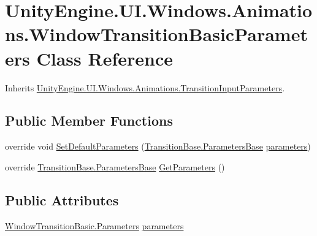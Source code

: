 \hypertarget{class_unity_engine_1_1_u_i_1_1_windows_1_1_animations_1_1_window_transition_basic_parameters}{}\section{Unity\+Engine.\+U\+I.\+Windows.\+Animations.\+Window\+Transition\+Basic\+Parameters Class Reference}
\label{class_unity_engine_1_1_u_i_1_1_windows_1_1_animations_1_1_window_transition_basic_parameters}


Inherits \hyperlink{class_unity_engine_1_1_u_i_1_1_windows_1_1_animations_1_1_transition_input_parameters}{Unity\+Engine.\+U\+I.\+Windows.\+Animations.\+Transition\+Input\+Parameters}.

\subsection*{Public Member Functions}
\begin{DoxyCompactItemize}
\item 
override void \hyperlink{class_unity_engine_1_1_u_i_1_1_windows_1_1_animations_1_1_window_transition_basic_parameters_a62552986f2ad19d5538ff935cb600c79}{Set\+Default\+Parameters} (\hyperlink{class_unity_engine_1_1_u_i_1_1_windows_1_1_animations_1_1_transition_base_1_1_parameters_base}{Transition\+Base.\+Parameters\+Base} \hyperlink{class_unity_engine_1_1_u_i_1_1_windows_1_1_animations_1_1_window_transition_basic_parameters_a817ab7ff379a687cfaf716c504e8c781}{parameters})
\item 
override \hyperlink{class_unity_engine_1_1_u_i_1_1_windows_1_1_animations_1_1_transition_base_1_1_parameters_base}{Transition\+Base.\+Parameters\+Base} \hyperlink{class_unity_engine_1_1_u_i_1_1_windows_1_1_animations_1_1_window_transition_basic_parameters_aa1092b62b0b954b00d21fa2e2e29d2ea}{Get\+Parameters} ()
\end{DoxyCompactItemize}
\subsection*{Public Attributes}
\begin{DoxyCompactItemize}
\item 
\hyperlink{class_unity_engine_1_1_u_i_1_1_windows_1_1_animations_1_1_window_transition_basic_1_1_parameters}{Window\+Transition\+Basic.\+Parameters} \hyperlink{class_unity_engine_1_1_u_i_1_1_windows_1_1_animations_1_1_window_transition_basic_parameters_a817ab7ff379a687cfaf716c504e8c781}{parameters}
\end{DoxyCompactItemize}


